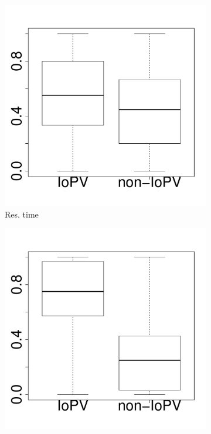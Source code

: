 \documentclass[10pt,journal,compsoc]{IEEEtran}
\begin{document}
\begin{figure}[t]
	\centering
        \begin{subfigure}{0.19\textwidth}
                \includegraphics[width=\linewidth]{Figures/runtime-cassandra-boxplot.pdf}
                \caption{Res. time}
        \end{subfigure}%
        \begin{subfigure}{0.19\textwidth}
                \includegraphics[width=\linewidth]{Figures/cpu-cassandra-boxplot.pdf}

\end{subfigure}
\end{figure}
\end{document}

